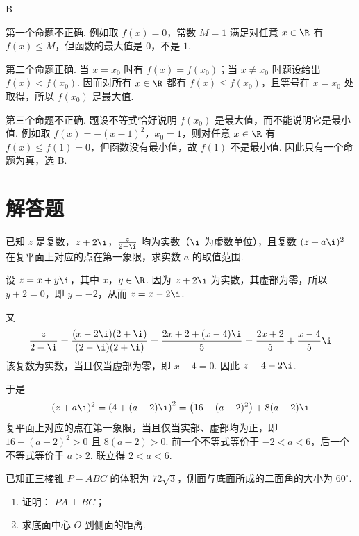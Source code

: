 \begin{answer}
B
\end{answer}

\begin{solution}
第一个命题不正确. 例如取 \(f(x)=0\)，常数 \(M=1\) 满足对任意 \(x\in\R\) 有 \(f(x)\leqslant M\)，但函数的最大值是 \(0\)，不是 \(1\).

第二个命题正确. 当 \(x=x_0\) 时有 \(f(x)=f(x_0)\)；当 \(x\neq x_0\) 时题设给出 \(f(x)<f(x_0)\). 因而对所有 \(x\in\R\) 都有 \(f(x)\leqslant f(x_0)\)，且等号在 \(x=x_0\) 处取得，所以 \(f(x_0)\) 是最大值.

第三个命题不正确. 题设不等式恰好说明 \(f(x_0)\) 是最大值，而不能说明它是最小值. 例如取 \(f(x)=-(x-1)^2\)，\(x_0=1\)，则对任意 \(x\in\R\) 有 \(f(x)\leqslant f(1)=0\)，但函数没有最小值，故 \(f(1)\) 不是最小值. 因此只有一个命题为真，选 B.
\end{solution}

\section{解答题}
\begin{problem}
已知 \(z\) 是复数，\(z + 2\i\)，\(\frac{z}{2 - \i}\) 均为实数（\(\i\) 为虚数单位），且复数 \((z + a\i)^2\) 在复平面上对应的点在第一象限，求实数 \(a\) 的取值范围.
\end{problem}

\begin{solution}
设 \(z=x+y\i\)，其中 \(x\)，\(y\in\R\). 因为 \(z+2\i\) 为实数，其虚部为零，所以 \(y+2=0\)，即 \(y=-2\)，从而 \(z=x-2\i\).

又
\[
\frac{z}{2-\i}=\frac{(x-2\i)(2+\i)}{(2-\i)(2+\i)}
=\frac{2x+2+(x-4)\i}{5}
=\frac{2x+2}{5}+\frac{x-4}{5}\i
\]
该复数为实数，当且仅当虚部为零，即 \(x-4=0\). 因此 \(z=4-2\i\).

于是
\[
(z+a\i)^2=\left(4+(a-2)\i\right)^2
=\left(16-(a-2)^2\right)+8(a-2)\i
\]
复平面上对应的点在第一象限，当且仅当实部、虚部均为正，即
\(16-(a-2)^2>0\) 且 \(8(a-2)>0\). 前一个不等式等价于
\(-2<a<6\)，后一个不等式等价于 \(a>2\). 联立得
\(2<a<6\).
\end{solution}

\begin{problem}
已知正三棱锥 \(P - ABC\) 的体积为 \(72\sqrt{3}\)，侧面与底面所成的二面角的大小为 \(60^{\circ}\).

\begin{enumerate}
\item 证明： \(PA \perp BC\)；
\item 求底面中心 \(O\) 到侧面的距离.
\end{enumerate}
\end{problem}

